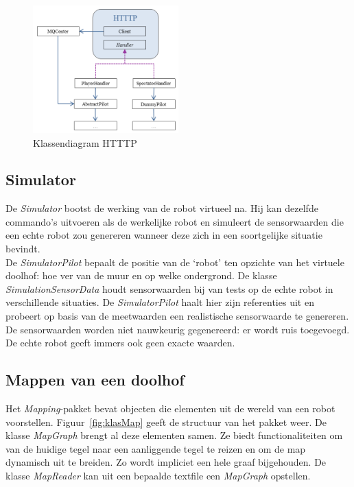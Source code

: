 \documentclass[tt3]{penoverslag}
\begin{document}
\begin{figure}[h]
\centering
	\includegraphics[width=0.5\textwidth]{KlasHTTTP}
\caption{Klassendiagram HTTTP}
\label{fig:klasHTTTP}
\end{figure}


\subsection{Simulator}
\label{ssec:Sim}
De \textit{Simulator} bootst de werking van de robot virtueel na. Hij kan dezelfde commando's uitvoeren als de werkelijke robot en simuleert de sensorwaarden die een echte robot zou genereren wanneer deze zich in een soortgelijke situatie bevindt.\\

De \textit{SimulatorPilot} bepaalt de positie van de `robot' ten opzichte van het virtuele doolhof: hoe ver van de muur en op welke ondergrond. De klasse \textit{SimulationSensorData} houdt sensorwaarden bij van tests op de echte robot in verschillende situaties. De \textit{SimulatorPilot} haalt hier zijn referenties uit en probeert op basis van de meetwaarden een realistische sensorwaarde te genereren. De sensorwaarden worden niet nauwkeurig gegenereerd: er wordt ruis toegevoegd. De echte robot geeft immers ook geen exacte waarden.\\

\subsection{Mappen van een doolhof} %
\label{ssec:Mapping}
Het \textit{Mapping}-pakket bevat objecten die elementen uit de wereld van een robot voorstellen. Figuur~\ref{fig:klasMap} geeft de structuur van het pakket weer. De klasse \textit{MapGraph} brengt al deze elementen samen. Ze biedt functionaliteiten om van de huidige tegel naar een aanliggende tegel te reizen en om de map dynamisch uit te breiden. Zo wordt impliciet een hele graaf bijgehouden. De klasse \textit{MapReader} kan uit een bepaalde textfile een \textit{MapGraph} opstellen.\\
\end{document}
